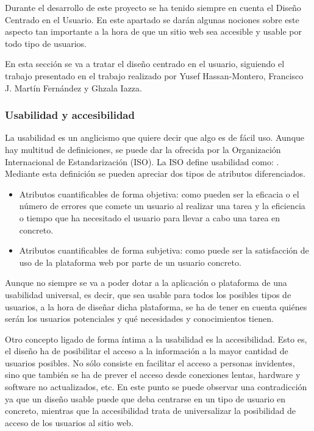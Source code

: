 Durante el desarrollo de este proyecto se ha tenido siempre en cuenta el Diseño Centrado en el Usuario. En este apartado se darán algunas nociones sobre este aspecto tan importante a la hora de que un sitio web sea accesible y usable por todo tipo de usuarios.

En esta sección se va a tratar el diseño centrado en el usuario, siguiendo el trabajo presentado en el trabajo realizado por Yusef Hassan-Montero, Francisco J. Martín Fernández y Ghzala Iazza.


\subsubsection{Usabilidad y accesibilidad}

La usabilidad es un anglicismo que quiere decir que algo es de fácil uso. Aunque hay multitud de definiciones, se puede dar la ofrecida por la Organización Internacional de Estandarización (ISO). La ISO define usabilidad como: . Mediante esta definición se pueden apreciar dos tipos de atributos diferenciados.

\begin{itemize}
	\item Atributos cuantificables de forma objetiva: como pueden ser la eficacia o el número de errores
		que comete un usuario al realizar una tarea y la eficiencia o tiempo que ha necesitado el usuario para llevar a cabo una tarea en concreto.
	\item Atributos cuantificables de forma subjetiva: como puede ser la satisfacción de uso de la
plataforma web por parte de un usuario concreto.
\end{itemize}

Aunque no siempre se va a poder dotar a la aplicación o plataforma de una usabilidad universal, es decir, que sea usable para todos los posibles tipos de usuarios, a la hora de diseñar dicha plataforma, se ha de tener en cuenta quiénes serán los usuarios potenciales y qué necesidades y conocimientos tienen.

Otro concepto ligado de forma íntima a la usabilidad es la accesibilidad. Esto es, el diseño ha de posibilitar el acceso a la información a la mayor cantidad de usuarios posibles. No sólo consiste en facilitar el acceso a personas invidentes, sino que también se ha de prever el acceso desde conexiones lentas, hardware y software no actualizados, etc. En este punto se puede observar una contradicción ya que un diseño usable puede que deba centrarse en un tipo de usuario en concreto, mientras que la accesibilidad trata de universalizar la posibilidad de acceso de los usuarios al sitio web.

